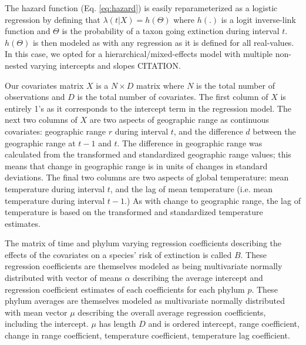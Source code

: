 \documentclass[12pt,letterpaper]{article}
\begin{document}

The hazard function (Eq. \ref{eq:hazard}) is easily reparameterized as a logistic regression by defining that \(\lambda(t | X) = h(\Theta)\) where \(h(.)\) is a logit inverse-link function and \(\Theta\) is the probability of a taxon going extinction during interval \(t\). \(h(\Theta)\) is then modeled as with any regression as it is defined for all real-values. In this case, we opted for a hierarchical/mixed-effects model with multiple non-nested varying intercepts and slopes CITATION. 

Our covariates matrix \(X\) is a \(N \times D\) matrix where \(N\) is the total number of observations and \(D\) is the total number of covariates. The first column of \(X\) is entirely 1's as it corresponds to the intercept term in the regression model. The next two columns of \(X\) are two aspects of geographic range as continuous covariates: geographic range \(r\) during interval \(t\), and the difference \(d\) between the geographic range at \(t - 1\) and \(t\). The difference in geographic range was calculated from the transformed and standardized geographic range values; this means that change in geographic range is in units of changes in standard deviations. The final two columns are two aspects of global temperature: mean temperature during interval \(t\), and the lag of mean temperature (i.e. mean temperature during interval \(t - 1\).) As with change to geographic range, the lag of temperature is based on the transformed and standardized temperature estimates. 

The matrix of time and phylum varying regression coefficients describing the effects of the covariates on a species' risk of extinction is called \(B\). These regression coefficients are themselves modeled as being multivariate normally distributed with vector of means \(\alpha\) describing the average intercept and regression coefficient estimates of each coefficients for each phylum \(p\). These phylum averages are themselves modeled as multivariate normally distributed with mean vector \(\mu\) describing the overall average regression coefficients, including the intercept. \(\mu\) has length \(D\) and is ordered intercept, range coefficient, change in range coefficient, temperature coefficient, temperature lag coefficient.
\end{document}
